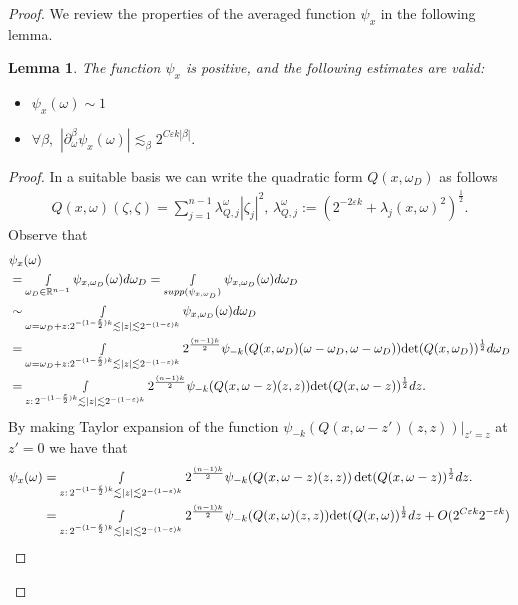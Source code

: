 \documentclass[12pt, reqno]{amsart}
\newtheorem{lemma}[theorem]{Lemma}
\theoremstyle{definition}
\theoremstyle{remark}
\numberwithin{equation}{section}
\begin{document}
\begin{proof}
We review the properties of the averaged function $\psi_{x}$ in the following lemma.
\begin{lemma}\label{function:psi:x}
    The function $\psi_x$ is positive, and the following estimates are valid:
    \begin{itemize}
        \item $\psi_{x}(\omega)\sim 1$
        \item  $\forall\beta,\,\,|\partial^\beta_\omega \psi_{x}(\omega) |\lesssim_{\beta}2^{C\varepsilon k|\beta|}. $
    \end{itemize}
\end{lemma} \begin{proof}In a suitable basis we can write the quadratic form $Q(x,\omega_D)$ as follows
 \begin{align*}
    Q(x,\omega)(\zeta,\zeta)=\sum_{j=1}^{n-1}\lambda_{Q,j}^{\omega}|\zeta_j|^2,\,\lambda_{Q,j}^{\omega}:=(2^{-2\varepsilon k}+\lambda_j(x,\omega)^{2})^{\frac{1}{2}}.
\end{align*}
Observe that
\begin{align*}
    &\psi_{x}(\omega) \\
    &=\smallint_{\omega_D\in \mathbb{R}^{n-1}}\psi_{x,\omega_D}(\omega)d\omega_{D}=\smallint_{\textnormal{supp}(\psi_{x,\omega_D})}\psi_{x,\omega_D}(\omega)d\omega_{D}\\
    &\sim \smallint_{ \omega=\omega_D+z:  2^{-(1-\frac{\varepsilon}{2})k }\lesssim  |z|\lesssim 2^{-(1-\varepsilon)k }   }\psi_{x,\omega_D}(\omega)d\omega_{D}\\
    &= \smallint_{ \omega=\omega_D+z: 2^{-(1-\frac{\varepsilon}{2})k }\lesssim  |z|\lesssim 2^{-(1-\varepsilon)k }    }{ 2^{\frac{(n-1)k}{2}}\psi_{-k}(Q(x,\omega_D)(\omega-\omega_D,\omega-\omega_D))   }{\det(Q(x,\omega_D))^{\frac{1}{2}}}d\omega_{D}\\
    &= \smallint_{z:\, 2^{-(1-\frac{\varepsilon}{2})k }\lesssim  |z|\lesssim 2^{-(1-\varepsilon)k } }{ 2^{\frac{(n-1)k}{2}}\psi_{-k}(Q(x,\omega-z)(z,z))   }{\det(Q(x,\omega-z))^{\frac{1}{2}}}dz.
  \end{align*}
 By making Taylor expansion of the function $\psi_{-k}(Q(x,\omega-z')(z,z))|_{z'=z}$ at $z'=0$ we have that
 \begin{align*}
         \psi_{x}(\omega)   &= \smallint_{ z:\,2^{-(1-\frac{\varepsilon}{2})k }\lesssim  |z|\lesssim 2^{-(1-\varepsilon)k } }{ 2^{\frac{(n-1)k}{2}}\psi_{-k}(Q(x,\omega-z)(z,z))   }\det(Q(x,\omega-z))^{\frac{1}{2}}dz.\\            
         &=\smallint_{ z:\,2^{-(1-\frac{\varepsilon}{2})k }\lesssim  |z|\lesssim 2^{-(1-\varepsilon)k } }{ 2^{\frac{(n-1)k}{2}}\psi_{-k}( Q(x,\omega)(z,z))   }{\det(Q(x,\omega))^{\frac{1}{2}}}dz+O(2^{C\varepsilon k}2^{-\varepsilon k})\\

\end{align*}
\end{proof}
\end{proof}
\end{document}
